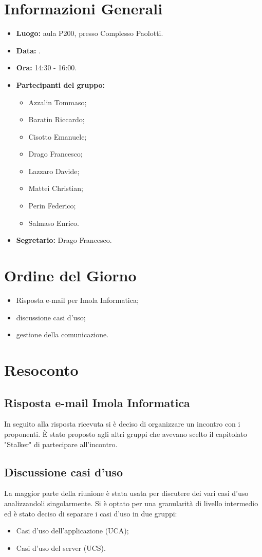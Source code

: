 \section{Informazioni Generali}
\begin{itemize}
\item \textbf{Luogo:} aula P200, presso Complesso Paolotti.
\item \textbf{Data:} \Data.
\item \textbf{Ora:} 14:30 - 16:00.
\item \textbf{Partecipanti del gruppo:}
	\begin{itemize}
		\item Azzalin Tommaso; 
		\item Baratin Riccardo;
		\item Cisotto Emanuele; 
		\item Drago Francesco;
		\item Lazzaro Davide;
		\item Mattei Christian;
		\item Perin Federico;
		\item Salmaso Enrico.
	\end{itemize} 
\item \textbf{Segretario:} Drago Francesco.
\end{itemize}


\section{Ordine del Giorno}
\begin{itemize}
\item Risposta e-mail per Imola Informatica;
\item discussione casi d'uso;
\item gestione della comunicazione.
\end{itemize}

\section{Resoconto}
\subsection{Risposta e-mail Imola Informatica}
In seguito alla risposta ricevuta si è deciso di organizzare un incontro con i proponenti.
È stato proposto agli altri gruppi che avevano scelto il capitolato "Stalker" di partecipare all'incontro. 

\subsection{Discussione casi d'uso}
La maggior parte della riunione è stata usata per discutere dei vari casi d'uso analizzandoli singolarmente.
Si è optato per una granularità di livello intermedio ed è stato deciso di separare i casi d'uso in due gruppi:
\begin{itemize}
\item Casi d'uso dell'applicazione (UCA);
\item Casi d'uso del server (UCS).
\end{itemize}


